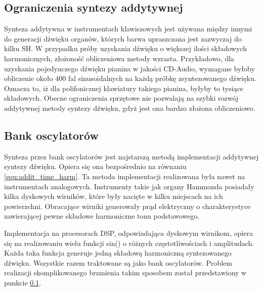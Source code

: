 \subsection{Ograniczenia syntezy addytywnej} \label{addit_ograniczenia}
Synteza addytywna w instrumentach klawiszowych jest używana między innymi do generacji dźwięku organów, których barwa upraszczana jest zazwyczaj do kilku SH. W przypadku próby uzyskania dźwięku o większej ilości składowych harmonicznych, złożoność obliczeniowa metody wzrasta.
Przykładowo, dla uzyskania pojedynczego dźwięku pianina w jakości CD-Audio,
wymagane byłoby obliczenie około 400 fal sinusoidalnych na każdą próbkę zsyntezowanego dźwięku. Oznacza to, iż dla polifonicznej klawiatury takiego pianina, byłyby to tysiące składowych. Obecne ograniczenia sprzętowe nie pozwalają na szybki rozwój addytywnej metody syntezy dźwięku, gdyż jest ona bardzo złożona obliczeniowo.

\subsection{Bank oscylatorów}
Synteza przez bank oscylatorów jest najstarszą metodą implementacji addytywnej syntezy dźwięku. Opiera się ona bezpośrednio na równaniu \ref{equ:addit_time_harm}.
Ta metoda implementacji realizowana była nawet na instrumentach analogowych. Instrumenty takie jak organy Hammonda posiadały kilka dyskowych wirników, które były nacięte w kilku miejscach na ich powierzchni. Obracające wirniki generowały prąd elektryczny o charakterystyce zawierającej pewne składowe harmoniczne tonu podstawowego.

Implementacja na procesorach DSP, odpowiadająca dyskowym wirnikom, opiera się na realizowaniu wielu funkcji sin() o różnych częstotliwościach i amplitudach. Każda taka funkcja generuje jedną składową harmoniczną syntezowanego dźwięku. Wszystkie razem traktowane są jako bank oscylatorów. Problem realizacji skomplikowanego brzmienia takim sposobem został przedstawiony w punkcie \ref{addit_ograniczenia}.

